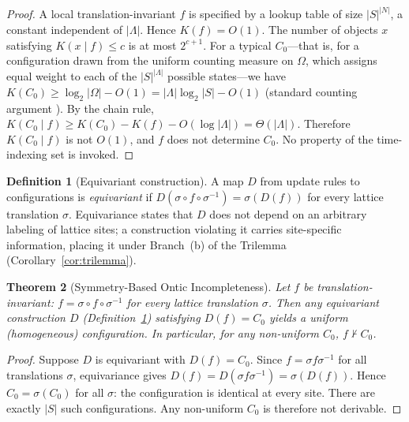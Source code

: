 \documentclass[12pt]{article}
\theoremstyle{plain}
\newtheorem{theorem}{Theorem}[section]
\theoremstyle{definition}
\newtheorem{definition}[theorem]{Definition}
\theoremstyle{remark}
\newcommand{\Lattice}{\Lambda}
\begin{document}
\begin{proof}
A local translation-invariant $f$ is specified by a lookup table of size $|S|^{|N|}$, a constant independent of $|\Lattice|$. Hence $K(f) = O(1)$. The number of objects $x$ satisfying $K(x \mid f) \leq c$ is at most $2^{c+1}$. For a typical $C_0$---that is, for a configuration drawn from the uniform counting measure on $\Omega$, which assigns equal weight to each of the $|S|^{|\Lattice|}$ possible states---we have $K(C_0) \geq \log_2|\Omega| - O(1) = |\Lattice|\log_2|S| - O(1)$ (standard counting argument \cite{kolmogorov1965,li-vitanyi2008}). By the chain rule, $K(C_0 \mid f) \geq K(C_0) - K(f) - O(\log|\Lattice|) = \Theta(|\Lattice|)$. Therefore $K(C_0 \mid f)$ is not $O(1)$, and $f$ does not determine $C_0$. No property of the time-indexing set is invoked.
\end{proof}

\begin{definition}[Equivariant construction]\label{def:equivariant}
A map $D$ from update rules to configurations is \emph{equivariant} if $D(\sigma \circ f \circ \sigma^{-1}) = \sigma(D(f))$ for every lattice translation $\sigma$. Equivariance states that $D$ does not depend on an arbitrary labeling of lattice sites; a construction violating it carries site-specific information, placing it under Branch~(b) of the Trilemma (Corollary~\ref{cor:trilemma}).
\end{definition}

\begin{theorem}[Symmetry-Based Ontic Incompleteness]\label{thm:sym-incomp}
Let $f$ be translation-invariant: $f = \sigma \circ f \circ \sigma^{-1}$ for every lattice translation $\sigma$. Then any equivariant construction $D$ (Definition~\ref{def:equivariant}) satisfying $D(f) = C_0$ yields a uniform (homogeneous) configuration. In particular, for any non-uniform $C_0$, $f \nvdash C_0$.
\end{theorem}

\begin{proof}
Suppose $D$ is equivariant with $D(f) = C_0$. Since $f = \sigma f \sigma^{-1}$ for all translations $\sigma$, equivariance gives $D(f) = D(\sigma f \sigma^{-1}) = \sigma(D(f))$. Hence $C_0 = \sigma(C_0)$ for all $\sigma$: the configuration is identical at every site. There are exactly $|S|$ such configurations. Any non-uniform $C_0$ is therefore not derivable.
\end{proof}
\end{document}
